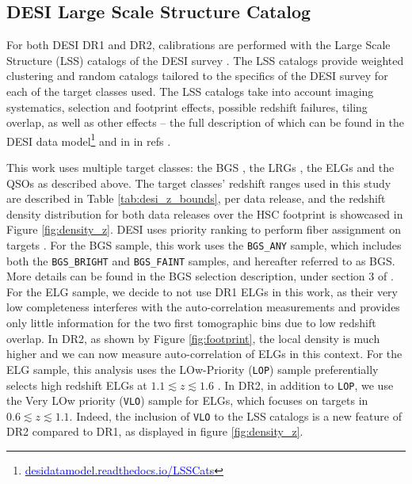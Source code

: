 \subsection{DESI Large Scale Structure Catalog}
\label{sec:data:desi}

For both DESI DR1 and DR2, calibrations are performed with the Large Scale Structure (LSS) catalogs of the DESI survey \cite{DESIConstructionLSS2024}. The LSS catalogs provide weighted clustering and random catalogs tailored to the specifics of the DESI survey for each of the target classes used. 
The LSS catalogs take into account imaging systematics, selection and footprint effects, possible redshift failures, tiling overlap, as well as other effects -- the full description of which can be found in the DESI data model\footnote{\href{https://desidatamodel.readthedocs.io/en/latest/DESI_ROOT/survey/catalogs/RELEASE/LSS/SPECPROD/LSScats/VERSION/data_clustering.html}{\textcolor{blue}{desidatamodel.readthedocs.io/LSSCats}}} and in in refs \cite{DESIConstructionLSS2024, DESI.2024.II.SampleDef}. 

This work uses multiple target classes: the BGS \cite{DESI.Selection.BGS.Hahn2023}, the LRGs \cite{DESI.Selection.LRG.Zhou2023}, the ELGs \cite{DESI.Selection.ELG.Raichoor2023} and the QSOs \cite{DESI.Selection.QSO.Chaussidon2023} as described above. 
The target classes' redshift ranges used in this study are described in Table \ref{tab:desi_z_bounds}, per data release, and the redshift density distribution for both data releases over the HSC footprint is showcased in Figure \ref{fig:density_z}. 
DESI uses priority ranking to perform fiber assignment on targets \cite{FiberSystem.Poppett.2024}. For the BGS sample, this work uses the \texttt{BGS\_ANY} sample, which includes both the \texttt{BGS\_BRIGHT} and \texttt{BGS\_FAINT} samples, and hereafter referred to as BGS. More details can be found in the BGS selection description, under section 3 of \cite{DESI.Selection.BGS.Hahn2023}.
For the ELG sample, we decide to not use DR1 ELGs in this work, as their very low completeness interferes with the auto-correlation measurements and provides only little information for the two first tomographic bins due to low redshift overlap. In DR2, as shown by Figure \ref{fig:footprint}, the local density is much higher and we can now measure auto-correlation of ELGs in this context.
For the ELG sample, this analysis uses the LOw-Priority (\texttt{LOP}) sample \cite{DESI.Selection.ELG.Raichoor2023} preferentially selects high redshift ELGs at $1.1\lesssim z\lesssim1.6$ . 
In DR2, in addition to \texttt{LOP}, we use the Very LOw priority (\texttt{VLO}) sample for ELGs, which focuses on targets in $0.6\lesssim z\lesssim1.1$. Indeed, the inclusion of \texttt{VLO} to the LSS catalogs is a new feature of DR2 compared to DR1, as displayed in figure \ref{fig:density_z}.

